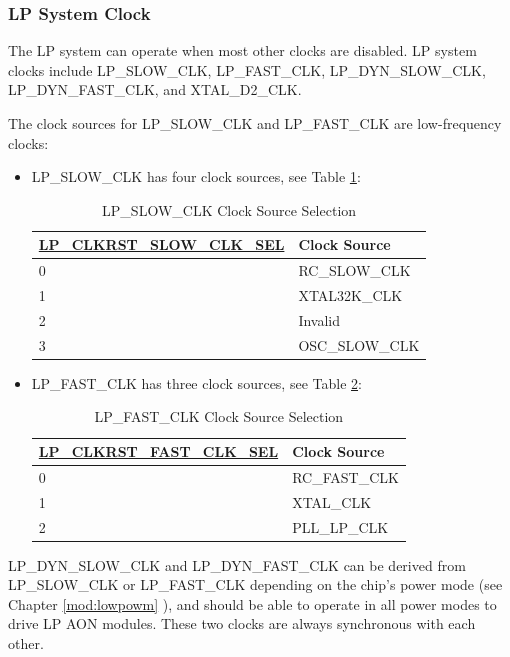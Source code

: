 \documentclass[main\_\_EN.tex]{subfiles}
\begin{document}
\subsubsection{LP System Clock}

The LP system can operate when most other clocks are disabled. LP system clocks include LP\_SLOW\_CLK, LP\_FAST\_CLK, LP\_DYN\_SLOW\_CLK, LP\_DYN\_FAST\_CLK, and XTAL\_D2\_CLK.

The clock sources for LP\_SLOW\_CLK and LP\_FAST\_CLK are low-frequency clocks:
\begin{itemize}
    \item LP\_SLOW\_CLK has four clock sources, see Table \ref{tab:lp-slow-clk-src}:

        \begin{longtable}[c]{|p{6cm}|p{7cm}| }
           \caption{LP\_SLOW\_CLK Clock Source Selection}
    		\label{tab:lp-slow-clk-src} \\
    	    \hline
            \rowcolor{lightgray}
            \textbf{\hyperref[fielddesc:LPCLKRSTSLOWCLKSEL]{LP\_CLKRST\_SLOW\_CLK\_SEL}} & \textbf{Clock Source} \\
            \hline
            0 & RC\_SLOW\_CLK \\\hline
            1 & XTAL32K\_CLK \\\hline
            2 & Invalid \\\hline
            3 & OSC\_SLOW\_CLK \\\hline
        \end{longtable}

    \item LP\_FAST\_CLK has three clock sources, see Table \ref{tab:lp-fast-clk-src}:

        \begin{longtable}[c]{|p{6cm}|p{7cm}| }
       \caption{LP\_FAST\_CLK Clock Source Selection}
		\label{tab:lp-fast-clk-src} \\
	    \hline
        \rowcolor{lightgray}
        \textbf{\hyperref[fielddesc:LPCLKRSTFASTCLKSEL]{LP\_CLKRST\_FAST\_CLK\_SEL}} & \textbf{Clock Source} \\
        \hline
        0 & RC\_FAST\_CLK \\\hline
        1 & XTAL\_CLK \\\hline
        2 & PLL\_LP\_CLK \\\hline
    \end{longtable}
\end{itemize}

LP\_DYN\_SLOW\_CLK and LP\_DYN\_FAST\_CLK can be derived from LP\_SLOW\_CLK or LP\_FAST\_CLK depending on the chip's power mode (see Chapter \ref{mod:lowpowm} \textit{}), and should be able to operate in all power modes to drive LP AON modules. These two clocks are always synchronous with each other.
\end{document}
